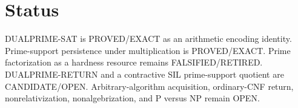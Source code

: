 \documentclass[11pt]{article}
\begin{document}
\section*{Status}
DUALPRIME-SAT is PROVED/EXACT as an arithmetic encoding identity. Prime-support persistence under multiplication is PROVED/EXACT. Prime factorization as a hardness resource remains FALSIFIED/RETIRED. DUALPRIME-RETURN and a contractive SIL prime-support quotient are CANDIDATE/OPEN. Arbitrary-algorithm acquisition, ordinary-CNF return, nonrelativization, nonalgebrization, and P versus NP remain OPEN.
\end{document}
